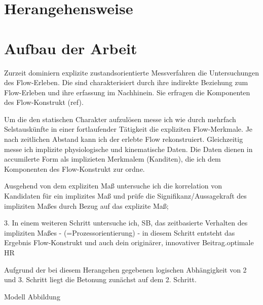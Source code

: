 \section{Herangehensweise} %
\label{sec:herangehensweise}


\section{Aufbau der Arbeit} %
\label{sec:aufbau_der_arbeit}

Zurzeit dominiern explizite zustandsorientierte Messverfahren die Untersuchungen des Flow-Erleben. Die sind charakterisiert durch ihre indirekte Beziehung zum Flow-Erleben und ihre erfassung im Nachhinein. Sie erfragen die Komponenten des Flow-Konstrukt (ref). 
 
Um die den statischen Charakter aufzulösen messe ich wie \citet{Reinhardt2006, Schuler2009} durch mehrfach Selstauskünfte in einer fortlaufender Tätigkeit die expliziten Flow-Merkmale. Je nach zeitlichen Abstand kann ich der erlebte Flow rekonstruiert. Gleichzeitig messe ich implizite physiologische und kinematische Daten. 
Die Daten dienen in accumilerte Form als implizieten Merkmalem (Kanditen), die ich dem Komponenten des Flow-Konstrukt zur ordne.  

Ausgehend von dem expliziten Maß untersuche ich die korrelation von Kandidaten für ein implizites Maß und prüfe die Signifikanz/Aussagekraft des impliziten Maßes durch Bezug auf das explizite Maß; 

3. In einem weiteren Schritt untersuche ich, SB, das zeitbasierte Verhalten des impliziten Maßes - (=Prozessorientierung) - in diesem Schritt entsteht das Ergebnis Flow-Konstrukt und auch dein originärer, innovativer Beitrag.optimale HR

Aufgrund der bei diesem Herangehen gegebenen logischen Abhängigkeit von 2 und 3. Schritt liegt die Betonung zunächst auf dem 2. Schritt. 

Modell Abbildung


